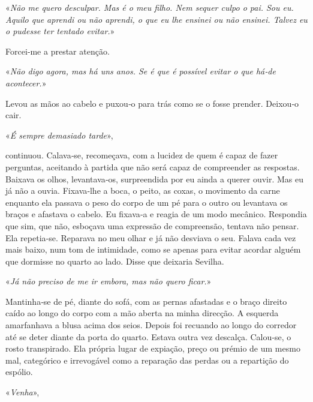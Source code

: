 «\emph{Não me quero desculpar. Mas é o meu filho. Nem sequer culpo o
pai. Sou eu. Aquilo que aprendi ou não aprendi, o que eu lhe ensinei ou
não ensinei. Talvez eu o pudesse ter tentado evitar.}»

Forcei­‑me a prestar atenção.

«\emph{Não digo agora, mas há uns anos. Se é que é possível evitar o que
há­‑de acontecer.}»

Levou as mãos ao cabelo e puxou­‑o para trás como se o fosse prender.
Deixou­‑o cair.

«\emph{É sempre demasiado tarde}»,

continuou. Calava­‑se, recomeçava, com a lucidez de quem é capaz de
fazer perguntas, aceitando à partida que não será capaz de compreender
as respostas. Baixava os olhos, levantava­‑os, surpreendida por eu ainda
a querer ouvir. Mas eu já não a ouvia. Fixava­‑lhe a boca, o peito, as
coxas, o movimento da carne enquanto ela passava o peso do corpo de um
pé para o outro ou levantava os braços e afastava o cabelo. Eu fixava­‑a
e reagia de um modo mecânico. Respondia que sim, que não, esboçava uma
expressão de compreensão, tentava não pensar. Ela repetia­‑se. Reparava
no meu olhar e já não desviava o seu. Falava cada vez mais baixo, num
tom de intimidade, como se apenas para evitar acordar alguém que
dormisse no quarto ao lado. Disse que deixaria Sevilha.

«\emph{Já não preciso de me ir embora, mas não quero ficar.}»

Mantinha­‑se de pé, diante do sofá, com as pernas afastadas e o braço
direito caído ao longo do corpo com a mão aberta na minha direcção. A
esquerda amarfanhava a blusa acima dos seios. Depois foi recuando ao
longo do corredor até se deter diante da porta do quarto. Estava outra
vez descalça. Calou­‑se, o rosto transpirado. Ela própria lugar de
expiação, preço ou prémio de um mesmo mal, categórico e irrevogável como
a reparação das perdas ou a repartição do espólio.

«\emph{Venha}»,

